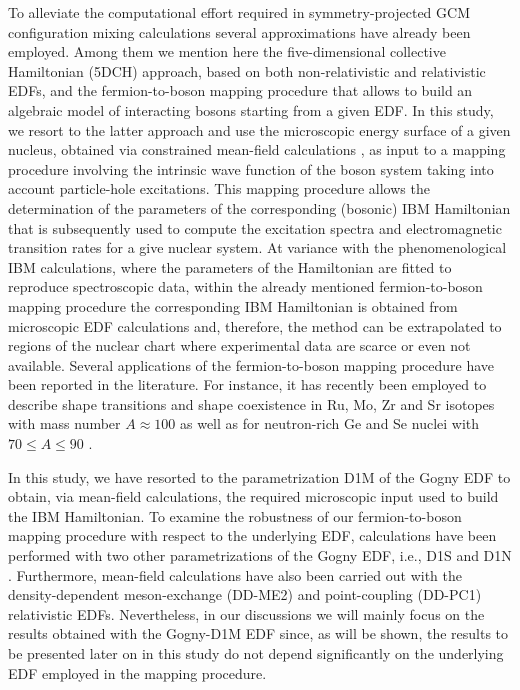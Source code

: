 \documentclass[twocolumn,showpacs,amsmath,amssymb,superscriptaddress]{revtex4-1}
\begin{document}
To alleviate the computational effort required in symmetry-projected 
GCM configuration mixing calculations several approximations have 
already been employed. Among them we mention here the five-dimensional 
collective Hamiltonian (5DCH) approach, based on both non-relativistic 
\cite{delaroche2010} and relativistic \cite{niksic2011} EDFs, and the 
fermion-to-boson mapping procedure that allows to build an algebraic 
model of interacting bosons \cite{nomura2008} starting from a given 
EDF. In this study, we resort to the latter approach \cite{nomura2008} 
and use the microscopic energy surface of a given nucleus, obtained via 
constrained mean-field calculations \cite{RS}, as input to a mapping 
procedure involving the intrinsic wave function of the boson system 
taking into account  particle-hole excitations. This mapping procedure 
allows the determination of the parameters of the corresponding 
(bosonic) IBM Hamiltonian that is subsequently used to compute the 
excitation spectra and electromagnetic transition rates for a give 
nuclear system. At variance with the phenomenological  IBM 
calculations, where the parameters of the Hamiltonian are fitted to 
reproduce spectroscopic data, within the  already mentioned 
fermion-to-boson mapping procedure \cite{nomura2008} the corresponding 
IBM Hamiltonian is obtained from microscopic EDF calculations and, 
therefore, the method can be extrapolated to regions of the nuclear 
chart where experimental data are scarce or even not available. Several 
applications of the fermion-to-boson mapping procedure have been 
reported in the literature. For instance, it has recently been employed 
to describe shape transitions and shape coexistence in Ru, Mo, Zr and 
Sr isotopes with mass number $A\approx 100$ \cite{nomura2016zr} as well 
as for neutron-rich Ge and Se nuclei with $70\leq A\leq 90$ 
\cite{nomura2017ge}.


In this study, we have resorted to the parametrization D1M \cite{D1M} 
of the Gogny EDF to obtain, via mean-field calculations, the required 
microscopic input used to build the IBM Hamiltonian. To examine the 
robustness of our fermion-to-boson mapping procedure with respect to 
the underlying EDF, calculations have  been performed with two other 
parametrizations of the Gogny EDF, i.e., D1S \cite{D1S} and D1N 
\cite{D1N}. Furthermore, mean-field calculations have also been carried 
out with the density-dependent meson-exchange (DD-ME2) 
\cite{lalazissis2005} and point-coupling (DD-PC1) \cite{DDPC1} 
relativistic EDFs. Nevertheless, in our discussions we will mainly 
focus on the results obtained with the Gogny-D1M EDF since, as will be 
shown, the results to be presented later on in this study do not depend 
significantly on the underlying EDF employed in the mapping procedure.
\end{document}
